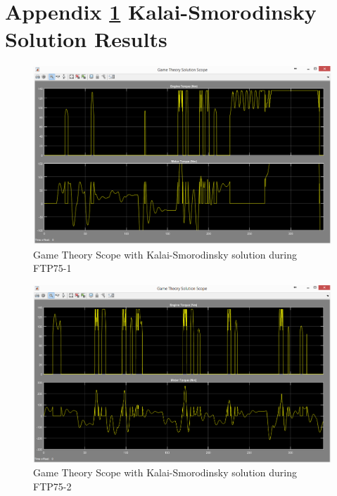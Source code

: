 \chapter{Appendix \ref{app:3} Kalai-Smorodinsky Solution Results}
\label{app:3}

\begin{figure}[h]
\centering
\includegraphics[scale=0.4]{figures/KalaiSmorodinsky/FTP75-1/gameTheory23Juni}
\caption{Game Theory Scope with Kalai-Smorodinsky solution during FTP75-1}
\label{fig:gtks1}
\end{figure}

\begin{figure}[h]
\centering
\includegraphics[scale=0.4]{figures/KalaiSmorodinsky/FTP75-2/gameTheory23Juni}
\caption{Game Theory Scope with Kalai-Smorodinsky solution during FTP75-2}
\label{fig:gtks2}
\end{figure}

